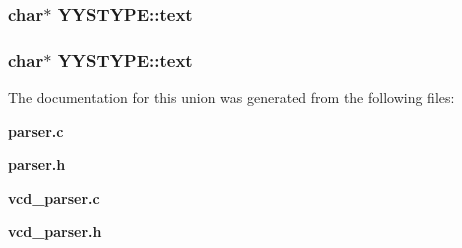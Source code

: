 \subsubsection{\setlength{\rightskip}{0pt plus 5cm}char$\ast$ YYSTYPE::text}\label{unionYYSTYPE_m10}


\subsubsection{\setlength{\rightskip}{0pt plus 5cm}char$\ast$ YYSTYPE::text}\label{unionYYSTYPE_m0}




The documentation for this union was generated from the following files:\begin{CompactItemize}
\item 
{\bf parser.c}\item 
{\bf parser.h}\item 
{\bf vcd\_\-parser.c}\item 
{\bf vcd\_\-parser.h}\end{CompactItemize}
